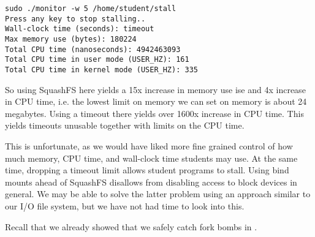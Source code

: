 \begin{lstlisting}
sudo ./monitor -w 5 /home/student/stall
Press any key to stop stalling..
Wall-clock time (seconds): timeout
Max memory use (bytes): 180224
Total CPU time (nanoseconds): 4942463093
Total CPU time in user mode (USER_HZ): 161
Total CPU time in kernel mode (USER_HZ): 335
\end{lstlisting}

So using SquashFS here yields a 15x increase in memory use ise and 4x increase
in CPU time, i.e. the lowest limit on memory we can set on memory is about 24
megabytes. Using a timeout there yields over 1600x increase in CPU time. This
yields timeouts unusable together with limits on the CPU time.

This is unfortunate, as we would have liked more fine grained control of how
much memory, CPU time, and wall-clock time students may use. At the same time,
dropping a timeout limit allows student programs to stall.  Using bind mounts
ahead of SquashFS disallows from disabling access to block devices in general.
We may be able to solve the latter problem using an approach similar to our I/O
file system, but we have not had time to look into this.

Recall that we already showed that we safely catch fork bombs in
.



